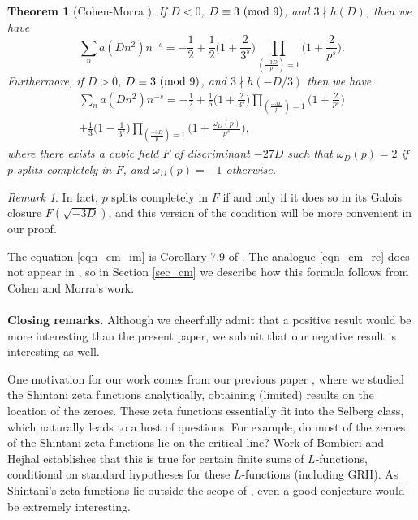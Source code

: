 \documentclass[12pt]{amsart}
\newtheorem{theorem}{Theorem}
\theoremstyle{remark}
\newtheorem*{remark}{Remark}
\numberwithin{theorem}{section} \numberwithin{equation}{section}
\newcommand{\textmod}{{\text {\rm mod}}}
\begin{document}
\begin{theorem}[Cohen-Morra \cite{CM}]\label{thm_cm}
If $D < 0$, $D \equiv 3 \ (\textmod \ 9)$, and $3 \nmid h(D)$, then we have
\begin{equation}\label{eqn_cm_im}
\sum_n a(Dn^2) n^{-s} = - \frac{1}{2} + \frac{1}{2} \bigg(1 + \frac{2}{3^s} \bigg)
\prod_{ \left( \frac{ -3D}{p} \right) = 1 } \bigg(1 + \frac{2}{p^s} \bigg).
\end{equation}
Furthermore, if $D > 0$, $D \equiv 3 \ (\textmod \ 9)$, 
and $3 \nmid h(-D/3)$ then we have
\begin{multline}\label{eqn_cm_re}
\sum_n a(Dn^2) n^{-s} =  - \frac{1}{2} + \frac{1}{6} \bigg(1 + \frac{2}{3^s} \bigg)
\prod_{ \left( \frac{ -3D}{p} \right) = 1 } \bigg(1 + \frac{2}{p^s} \bigg)
\\ 
+ \frac{1}{3} \bigg(1 - \frac{1}{3^s} \bigg)
\prod_{ \left( \frac{ -3D}{p} \right) = 1 } \bigg(1 + \frac{\omega_D(p)}{p^s} \bigg), \ \ \ \ \  \ \ \
\end{multline}
where there exists a cubic field $F$ of discriminant $-27 D$ such that $\omega_D(p) = 2$
if $p$ splits completely in $F$, and $\omega_D(p) = -1$ otherwise. 
\end{theorem}
\begin{remark}
In fact, $p$ splits completely in $F$ if and only if it does so in its Galois closure
$F(\sqrt{-3D})$, and this version of the condition will be more convenient in our proof.
\end{remark}

The equation \eqref{eqn_cm_im} is Corollary 7.9 of \cite{CM}. The analogue \eqref{eqn_cm_re}
does not appear in \cite{CM, M}, so in Section \ref{sec_cm} we describe how this formula follows from Cohen and Morra's
work. 
\\
\\
{\bf Closing remarks.} Although we cheerfully admit that a positive result would be more interesting than the present paper,
we submit that our negative result is interesting as well.

One motivation for our work comes from our previous paper \cite{T}, where we studied the Shintani zeta functions analytically,
obtaining (limited) results on the location of
the zeroes. These zeta functions essentially fit into the Selberg class, which naturally leads to a host of questions.
For example, do most of the zeroes of the Shintani zeta functions
lie on the critical line? Work of Bombieri and Hejhal \cite{BH} establishes that this is true for certain finite sums of $L$-functions,
conditional on standard hypotheses for these $L$-functions (including GRH).
As Shintani's zeta functions lie outside the scope of \cite{BH},
even a good conjecture would be extremely interesting.
\end{document}
